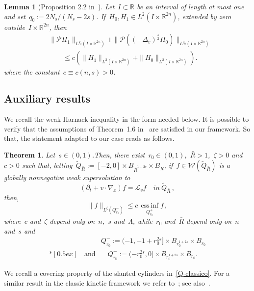 \documentclass[leqno,10pt]{amsart}
\theoremstyle{plain}
\newtheorem{theorem}{Theorem}[section]
\newtheorem{lemma}{Lemma}[section]
\theoremstyle{remark}
\numberwithin{equation}{section}
\def\er{\mathbb{R}}
\newcommand{\Lc}{\mathcal{L}_v}
\newcommand{\Wc}{\mathcal{W}}
\begin{document}
{\begin{lemma}[Proposition 2.2 in~\cite{IS20}]\label{lemma:kolmogorov-young}
Let~$I\subset\er$ be an interval of length at most one and set~$q_0:=2N_s/(N_s-2s)$.
If~$H_0,H_1\in L^2(I\times\er^{2n})$, extended by zero outside~$I\times\er^{2n}$, then
\[
\begin{aligned}
&\|\mathscr{P}H_1\|_{L^{q_0}(I\times\er^{2n})}
+
\|\mathscr{P}(( -\Delta_v)^\frac{s}{2}H_0)\|_{L^{q_0}(I\times\er^{2n})}
\\
&\qquad\leq
c\left(\|H_1\|_{L^2(I\times\er^{2n})}
+\|H_0\|_{L^2(I\times\er^{2n})}\right).
\end{aligned}
\]
where the constant~$c\equiv c(n,s)>0$.
\end{lemma}



\subsection{Auxiliary results}
 We recall the weak Harnack inequality in the form needed below. It is possible to verify that the assumptions of Theorem~1.6 in~\cite{IS20} are satisfied in our framework. So that, the statement adapted to our case reads as follows.
 
   \begin{theorem}\label{thm:weak} Let~$s \in (0,1)$.Then, there exist~$r_{0}\in(0,1)$,~$\bar{R} >1$,~$\zeta>0$ and~$c>0$ such that, letting~$\widetilde{Q}_{\bar{R}} := [-2,0]\times B_{\bar{R}^{1+2s}} \times B_{\bar{R}}$, if~$f \in \Wc(\widetilde{Q}_{\bar{R}})$ is a globally nonnegative weak supersolution to
      \[
   (\partial_t + v\cdot \nabla_x) f = \Lc f \quad {in}~\widetilde{Q}_{\bar{R}}\,,
      \]
   then,
   \[
       \|f\|_{L^\zeta(Q^-_{r_0})} \leq c\, \operatorname*{ess\,inf}_{Q^+_{r_{0}}}f\,,
   \]
   where~$c$ and~$\zeta$ depend only on~$n$,~$s$ and~$\Lambda$, while~$r_{0}$ and~$\bar{R}$ depend only on~$n$ and~$s$
    and
    \begin{equation*}
		\begin{split}
			& {Q}^-_{r_{0}} := (-1,-1+r_{0}^{2s}] \times B_{r_{0}^{1+2s}}\times B_{r_{0}}\\*[0.5ex] \quad \text{and} & \quad  {Q}^+_{r_{0}} := (-r_{0}^{2s},0] \times B_{r_{0}^{1+2s}}\times B_{r_{0}}.
		\end{split}
	\end{equation*}
   \end{theorem}

\medskip
We recall a covering property of the slanted cylinders in~\eqref{Q-classico}.  For a similar result in the classic kinetic framework we refer to~\cite[Lemma~4.2]{PP04}; see also~\cite{AP20}.


}
\end{document}
